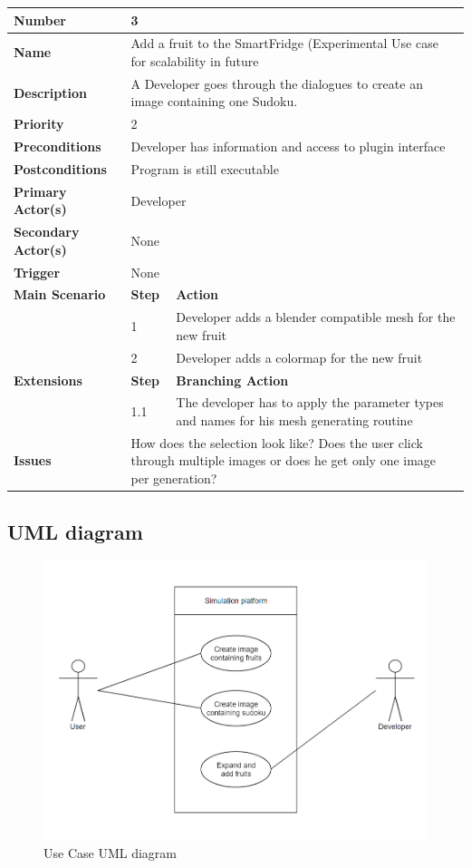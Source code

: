 \documentclass[a4paper,12pt]{article}
\begin{document}
\begin{tabularx}{\linewidth}{|l|l|X|}
\hline
\textbf{Number} & \multicolumn{2}{l|}{3} \\
\hline
\textbf{Name} & \multicolumn{2}{X|}{Add a fruit to the SmartFridge (Experimental Use case for scalability in future} \\
\hline
\textbf{Description} &  \multicolumn{2}{X|}{A Developer goes through the dialogues to create an image containing one Sudoku.} \\
\hline
\textbf{Priority} & \multicolumn{2}{l|}{2} \\
\hline
\textbf{Preconditions} & \multicolumn{2}{l|}{Developer has information and access to plugin interface} \\
\hline
\textbf{Postconditions} & \multicolumn{2}{l|}{Program is still executable} \\
\hline
\textbf{Primary Actor(s)} & \multicolumn{2}{l|}{Developer} \\
\hline
\textbf{Secondary Actor(s)} & \multicolumn{2}{l|}{None} \\
\hline
\textbf{Trigger} & \multicolumn{2}{l|}{None} \\
\hline
\textbf{Main Scenario} & \textbf{Step} & \textbf{Action} \\
\hline
 & 1 & Developer adds a blender compatible mesh for the new fruit\\
\cline{2-3}
 & 2 & Developer adds a colormap for the new fruit \\
\hline
\textbf{Extensions} & \textbf{Step} & \textbf{Branching Action} \\
\hline
& 1.1 & The developer has to apply the parameter types and names for his mesh generating routine \\
\hline
\textbf{Issues} & \multicolumn{2}{X|}{How does the selection look like? Does the user click through multiple images or does he get only one image per generation?} \\
\hline
\end{tabularx}
\subsection{UML diagram}
\begin{figure}[H]
\centering
\includegraphics[scale=0.65]{usecase_new_1.png}
\caption{Use Case UML diagram}
\end{figure}
\end{document}
